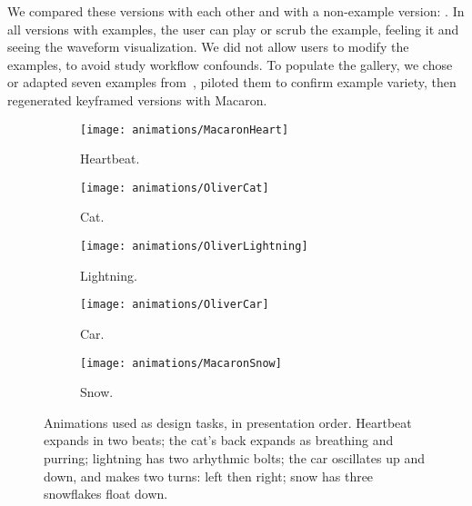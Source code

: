 We compared these versions with each other and with a non-example version:
\none.
%
%
In all versions with examples, the user can play or scrub the example, feeling it and seeing the waveform visualization.
We did not allow users to modify the examples, to avoid study workflow confounds.
To populate the gallery, we chose or adapted seven examples from~\cite{Seifi2015}, 
piloted them to confirm example variety, then regenerated keyframed versions with Macaron.


\newcommand{\animationHeight}{0.5in}
 \newcommand{\animationWidth}{0.18\textwidth}

\begin{figure}[t]
    \centering
    \begin{subfigure}{0.10\textwidth}
            \centering
            \texttt{[image: animations/MacaronHeart]}
    	   \caption{Heartbeat.}
    	   \label{fig:animation:heartbeat}
    \end{subfigure}
    \begin{subfigure}{0.06\textwidth}
            \centering
            \texttt{[image: animations/OliverCat]}
    	   \caption{Cat.}
    	   \label{fig:animation:cat}
    \end{subfigure}
    \begin{subfigure}{0.11\textwidth}
            \centering
            \texttt{[image: animations/OliverLightning]}
    	   \caption{Lightning.}
    	   \label{fig:animation:lightning}
    \end{subfigure}
    \begin{subfigure}{0.07\textwidth}
            \centering
            \texttt{[image: animations/OliverCar]}
    	   \caption{Car.}
    	   \label{fig:animation:car}
    \end{subfigure}
    \begin{subfigure}{0.08\textwidth}
            \centering
            \texttt{[image: animations/MacaronSnow]}
    	   \caption{Snow.}
    	   \label{fig:animation:snow}
    \end{subfigure}
    
    \caption{Animations used as design tasks, in presentation order. Heartbeat expands in two beats; the cat's back expands as breathing and purring; lightning has two arhythmic bolts; the car oscillates up and down, and makes two turns: left then right; snow has three snowflakes float down.
    }
    \label{fig:animation}
\end{figure}



